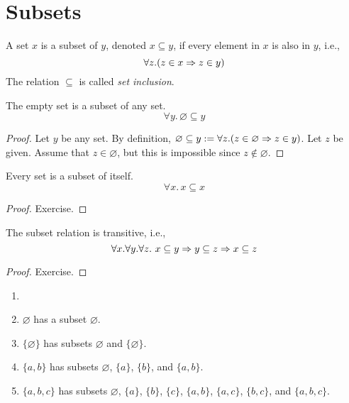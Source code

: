 \documentclass[article,10pt,oneside]{memoir}
\begin{document}
\section{Subsets}
\label{sec:subsets}

\begin{defn}
  A set $x$ is a subset of $y$, denoted $x \subseteq y$, if every element in $x$ is also in $y$, i.e.,
  \[
    \forall z.(z \in x \Rightarrow z \in y)
  \]
  The relation $\subseteq$ is called \emph{set inclusion}.
\end{defn}

\begin{lem}
  The empty set is a subset of any set.
  \[
    \forall y.\,\varnothing \subseteq y
  \]
\end{lem}
\begin{proof}
  Let $y$ be any set.
  By definition, $\varnothing \subseteq y := \forall z.(z \in \varnothing \Rightarrow z \in y)$.
  Let $z$ be given.
  Assume that $z \in \varnothing$, but this is impossible since $z \notin \varnothing$.
\end{proof}

\begin{lem}
  Every set is a subset of itself.
  \[
    \forall x.\, x \subseteq x
  \]
\end{lem}
\begin{proof}
  Exercise.
\end{proof}

\begin{lem}
  The subset relation is transitive, i.e.,
  \[
    \forall x.\forall y.\forall z.~x \subseteq y \Rightarrow y \subseteq z \Rightarrow x \subseteq z
  \]
\end{lem}
\begin{proof}
  Exercise.
\end{proof}

\begin{eg}\label{eg:subsets}
  \begin{enumerate}
  \item[]
  \item $\varnothing$ has a subset $\varnothing$.
  \item $\{ \varnothing \}$ has subsets $\varnothing$ and $\{ \varnothing \}$.
  \item $\{ a,b \}$ has subsets $\varnothing$, $\{ a \}$, $\{ b \}$, and $\{ a, b \}$.
  \item $\{ a,b,c \}$ has subsets $\varnothing$, $\{ a \}$, $\{ b \}$, $\{ c \}$, $\{ a,b \}$, $\{ a,c \}$, $\{ b,c \}$, and $\{ a,b,c \}$.
  \end{enumerate}
\end{eg}
\end{document}
